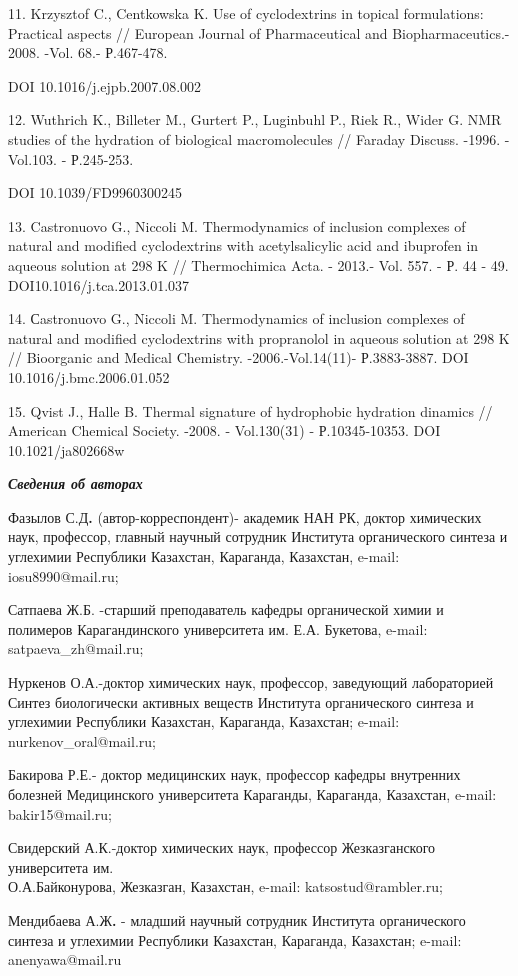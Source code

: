 \begin{noparindent}
11. Krzysztof C., Centkowska K. Use of cyclodextrins in topical
formulations: Practical aspects // European Journal of Pharmaceutical
and Biopharmaceutics.- 2008. -Vol. 68.- Р.467-478.

DOI 10.1016/j.ejpb.2007.08.002

12. Wuthrich K., Billeter M., Gurtert P., Luginbuhl P., Riek R., Wider
G. NMR studies of the hydration of biological macromolecules // Faraday
Discuss. -1996. - Vol.103. - Р.245-253.

DOI 10.1039/FD9960300245

13. Castronuovo G., Niccoli M. Thermodynamics of inclusion complexes of
natural and modified cyclodextrins with acetylsalicylic acid and
ibuprofen in aqueous solution at 298 K // Thermochimica Acta. - 2013.-
Vol. 557. - Р. 44 - 49. DOI10.1016/j.tca.2013.01.037

14. Сastronuovo G., Niccoli M. Thermodynamics of inclusion complexes of
natural and modified cyclodextrins with propranolol in aqueous solution
at 298 K // Bioorganic and Medical Chemistry. -2006.-Vol.14(11)-
Р.3883-3887. DOI 10.1016/j.bmc.2006.01.052~

15. Qvist J., Halle B. Thermal signature of hydrophobic hydration
dinamics // American Chemical Society. -2008. - Vol.130(31) -
Р.10345-10353. DOI 10.1021/ja802668w
\end{noparindent}

\emph{{\bfseries Сведения об авторах}}

\begin{noparindent}
Фазылов С.Д{\bfseries .} (автор-корреспондент)- академик НАН РК, доктор
химических наук, профессор, главный научный сотрудник Института
органического синтеза и углехимии Республики Казахстан, Караганда,
Казахстан, e-mail: iosu8990@mail.ru;

Сатпаева Ж.Б. -старший преподаватель кафедры органической химии и
полимеров Карагандинского университета им. Е.А. Букетова, e-mail:
satpaeva\_zh@mail.ru;

Нуркенов О.А.-доктор химических наук, профессор, заведующий лабораторией
Синтез биологически активных веществ Института органического синтеза и
углехимии Республики Казахстан, Караганда, Казахстан; e-mail:
nurkenov\_oral@mail.ru;

Бакирова Р.Е.- доктор медицинских наук, профессор кафедры внутренних
болезней Медицинского университета Караганды, Караганда, Казахстан,
e-mail: bakir15@mail.ru;

Свидерский А.К.-доктор химических наук, профессор Жезказганского
университета им. \\О.А.Байконурова, Жезказган, Казахстан, e-mail:
katsostud@rambler.ru;

Мендибаева А.Ж{\bfseries .} - младший научный сотрудник Института
органического синтеза и углехимии Республики Казахстан, Караганда,
Казахстан; e-mail: anenyawa@mail.ru
\end{noparindent}

